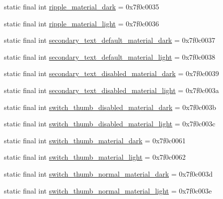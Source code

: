 \begin{CompactItemize}
\item 
static final int \hyperlink{classandroid_1_1support_1_1v4_1_1_r_1_1color_386eb3098c5de7be9f35e4dec4d9d2f7}{ripple\_\-material\_\-dark} = 0x7f0c0035
\item 
static final int \hyperlink{classandroid_1_1support_1_1v4_1_1_r_1_1color_72b8ddd6a94be3aa63e091ba1ef758c7}{ripple\_\-material\_\-light} = 0x7f0c0036
\item 
static final int \hyperlink{classandroid_1_1support_1_1v4_1_1_r_1_1color_1b748ed386088a264d9af9debee123f9}{secondary\_\-text\_\-default\_\-material\_\-dark} = 0x7f0c0037
\item 
static final int \hyperlink{classandroid_1_1support_1_1v4_1_1_r_1_1color_14ffad362024dabc3a2bf3b8b1573861}{secondary\_\-text\_\-default\_\-material\_\-light} = 0x7f0c0038
\item 
static final int \hyperlink{classandroid_1_1support_1_1v4_1_1_r_1_1color_8646b6753a530e0fda6775c8fddc4fdc}{secondary\_\-text\_\-disabled\_\-material\_\-dark} = 0x7f0c0039
\item 
static final int \hyperlink{classandroid_1_1support_1_1v4_1_1_r_1_1color_25530ec75b41f11fe8e70964538ce39a}{secondary\_\-text\_\-disabled\_\-material\_\-light} = 0x7f0c003a
\item 
static final int \hyperlink{classandroid_1_1support_1_1v4_1_1_r_1_1color_212af6c755aa1bfdbbf49b51a4da4cfd}{switch\_\-thumb\_\-disabled\_\-material\_\-dark} = 0x7f0c003b
\item 
static final int \hyperlink{classandroid_1_1support_1_1v4_1_1_r_1_1color_386cf33ab1827f8350a7b940e3a1ada6}{switch\_\-thumb\_\-disabled\_\-material\_\-light} = 0x7f0c003c
\item 
static final int \hyperlink{classandroid_1_1support_1_1v4_1_1_r_1_1color_e4ad22f9c88ed26b2451a20cc321c26f}{switch\_\-thumb\_\-material\_\-dark} = 0x7f0c0061
\item 
static final int \hyperlink{classandroid_1_1support_1_1v4_1_1_r_1_1color_7aacbc53ff24018a1805beb1548edc93}{switch\_\-thumb\_\-material\_\-light} = 0x7f0c0062
\item 
static final int \hyperlink{classandroid_1_1support_1_1v4_1_1_r_1_1color_6b9f1f98efbe2f083c82fa8689c14e61}{switch\_\-thumb\_\-normal\_\-material\_\-dark} = 0x7f0c003d
\item 
static final int \hyperlink{classandroid_1_1support_1_1v4_1_1_r_1_1color_8504cc9577bad9a64d4a6c184e304a29}{switch\_\-thumb\_\-normal\_\-material\_\-light} = 0x7f0c003e
\end{CompactItemize}


